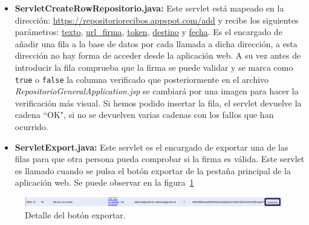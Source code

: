 \begin{itemize}

\item \textbf{ServletCreateRowRepositorio.java:} Este servlet está mapeado en la dirección: \url{https://repositoriorecibos.appspot.com/add} y recibe los siguientes parámetros: \url{texto}, \url{url\_firma}, \url{token}, \url{destino} y \url{fecha}. Es el encargado de añadir una fila a la base de datos por cada llamada a dicha dirección, a esta dirección no hay forma de acceder desde la aplicación web. A su vez antes de introducir la fila comprueba que la firma se puede validar y se marca como \lstinline{true} o \lstinline{false} la columna verificado que posteriormente en el archivo \textit{RepositorioGeneralApplication.jsp} se cambiará por una imagen para hacer la verificación más visual. Si hemos podido insertar la fila, el servlet devuelve la cadena ``OK", si no se devuelven varias cadenas con los fallos que han ocurrido.


\item \textbf{ServletExport.java:} Este servlet es el encargado de exportar una de las filas para que otra persona pueda comprobar si la firma es válida. Este servlet es llamado cuando se pulsa el botón exportar de la pestaña principal de la aplicación web. Se puede observar en la figura~\ref{fig:botonExportar}

\end{itemize}

\begin{figure}[h]
  \centering
    \includegraphics[scale=0.4]{./GoogleAppEngine/imagenes/botonExportar.png}
  \caption{Detalle del botón exportar.}
  \label{fig:botonExportar}
\end{figure}

